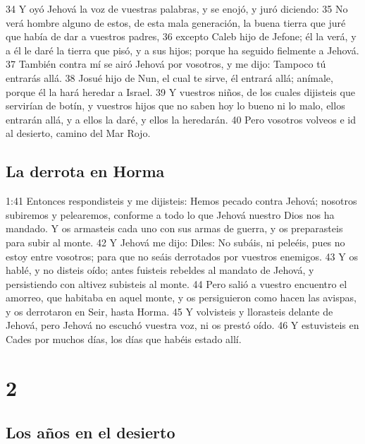 34 Y oyó Jehová la voz de vuestras palabras, y se enojó, y juró diciendo:
35 No verá hombre alguno de estos, de esta mala generación, la buena tierra que juré que había de dar a vuestros padres,
36 excepto Caleb hijo de Jefone; él la verá, y a él le daré la tierra que pisó, y a sus hijos; porque ha seguido fielmente a Jehová.
37 También contra mí se airó Jehová por vosotros, y me dijo: Tampoco tú entrarás allá.
38 Josué hijo de Nun, el cual te sirve, él entrará allá; anímale, porque él la hará heredar a Israel.
39 Y vuestros niños, de los cuales dijisteis que servirían de botín, y vuestros hijos que no saben hoy lo bueno ni lo malo, ellos entrarán allá, y a ellos la daré, y ellos la heredarán.
40 Pero vosotros volveos e id al desierto, camino del Mar Rojo.

\section{La derrota en Horma }

1:41 Entonces respondisteis y me dijisteis: Hemos pecado contra Jehová; nosotros subiremos y pelearemos, conforme a todo lo que Jehová nuestro Dios nos ha mandado. Y os armasteis cada uno con sus armas de guerra, y os preparasteis para subir al monte.
42 Y Jehová me dijo: Diles: No subáis, ni peleéis, pues no estoy entre vosotros; para que no seáis derrotados por vuestros enemigos.
43 Y os hablé, y no disteis oído; antes fuisteis rebeldes al mandato de Jehová, y persistiendo con altivez subisteis al monte.
44 Pero salió a vuestro encuentro el amorreo, que habitaba en aquel monte, y os persiguieron como hacen las avispas, y os derrotaron en Seir, hasta Horma.
45 Y volvisteis y llorasteis delante de Jehová, pero Jehová no escuchó vuestra voz, ni os prestó oído.
46 Y estuvisteis en Cades por muchos días, los días que habéis estado allí.

\chapter{2}

\section{Los años en el desierto}

